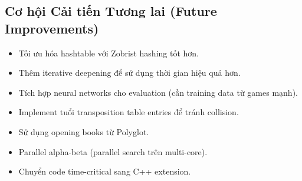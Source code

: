 \subsection{Cơ hội Cải tiến Tương lai (Future Improvements)}
\begin{itemize}
    \item Tối ưu hóa hashtable với Zobrist hashing tốt hơn.
    \item Thêm iterative deepening để sử dụng thời gian hiệu quả hơn.
    \item Tích hợp neural networks cho evaluation (cần training data từ games mạnh).
    \item Implement tuổi transposition table entries để tránh collision.
    \item Sử dụng opening books từ Polyglot.
    \item Parallel alpha-beta (parallel search trên multi-core).
    \item Chuyển code time-critical sang C++ extension.
\end{itemize}

